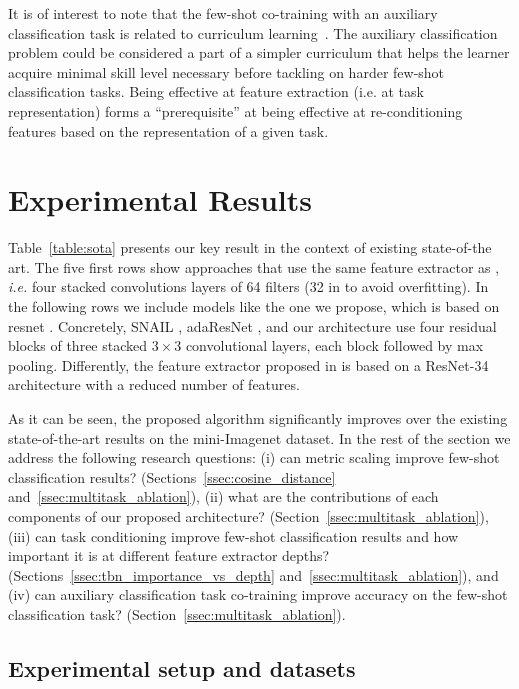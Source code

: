 \documentclass{article}
\begin{document}
It is of interest to note that the few-shot co-training with an auxiliary classification task is related to curriculum learning~\citep{Santoro16metalearning}. The auxiliary classification problem could be considered a part of a simpler curriculum that helps the learner acquire minimal skill level necessary before tackling on harder few-shot classification tasks. Being effective at feature extraction (i.e. at task representation) forms a ``prerequisite'' at being effective at re-conditioning features based on the representation of a given task.

\section{Experimental Results}\label{sec:experiments}

Table~\ref{table:sota} presents our key result in the context of existing state-of-the art. The five first rows show approaches that use the same feature extractor as \citep{vinyals2016matching}, \emph{i.e.} four stacked convolutions layers of 64 filters (32 in \cite{ravi2016optimization, finn2017model} to avoid overfitting). In the following rows we include models like the one we propose, which is based on resnet \cite{He2016Deep}. Concretely, SNAIL \cite{mishra2018simle}, adaResNet \cite{munkhdalai2018rapid}, and our architecture use four residual blocks of three stacked $3\times3$ convolutional layers, each block followed by max pooling. Differently, the feature extractor proposed in \cite{Bauer2017discriminative} is based on a ResNet-34 architecture with a reduced number of features. 

As it can be seen, the proposed algorithm significantly improves over the existing state-of-the-art results on the mini-Imagenet dataset. In the rest of the section we address the following research questions: (i) can metric scaling improve few-shot classification results? (Sections~\ref{ssec:cosine_distance} and~\ref{ssec:multitask_ablation}), (ii) what are the contributions of each components of our proposed architecture? (Section~\ref{ssec:multitask_ablation}), (iii) can task conditioning improve few-shot classification results and how important it is at different feature extractor depths? (Sections~\ref{ssec:tbn_importance_vs_depth} and~\ref{ssec:multitask_ablation}), and (iv) can auxiliary classification task co-training improve accuracy on the few-shot classification task? (Section~\ref{ssec:multitask_ablation}).

\subsection{Experimental setup and datasets}\label{ssec:datasets}
\end{document}
